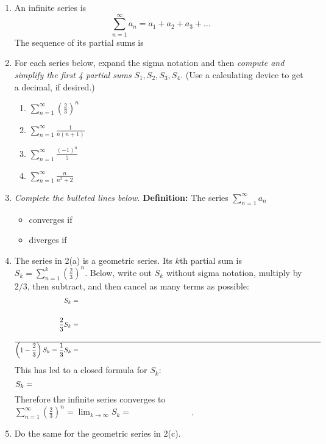 \documentclass[11pt,fleqn]{article}
\newcommand{\ds}{\displaystyle}
\begin{document}
\normalsize
\vspace{-5mm}
\hrulefill
\begin{enumerate}
\item An infinite series is
    $$\sum_{n=1}^\infty a_n = a_1 + a_2 + a_3 + \dots$$
The sequence of its partial sums is

\vspace{1.5in}

\item For each series below, expand the sigma notation and then \emph{compute and simplify the first 4 partial sums} $S_1, S_2, S_3,S_4.$  (Use a calculating device to get a decimal, if desired.) 
	\begin{enumerate}
	\item $\displaystyle \sum_{n=1}^\infty \left( \frac{2}{3} \right)^n$
	\vfill
	\item $\displaystyle \sum_{n=1}^\infty  \frac{1}{n(n+1)} $
	\vfill
	\item $\displaystyle \sum_{n=1}^\infty  \frac{(-1)^n}{5}$
	\vfill

\clearpage\newpage
	\item $\displaystyle \sum_{n=1}^\infty  \frac{n}{n^2+2}$
	\vfill
	\end{enumerate}

\item \emph{Complete the bulleted lines below.} \quad \textbf{Definition:} The series $\ds \sum_{n=1}^\infty a_n$ \\
\begin{itemize}
	\item converges if \\
	
	\item diverges if \\
	
\end{itemize}

\item The series in 2(a) is a geometric series.  Its $k$th partial sum is $\ds S_k = \sum_{n=1}^k \left(\frac{2}{3}\right)^n$.  Below, write out $S_k$ without sigma notation, multiply by $2/3$, then subtract, and then cancel as many terms as possible:
\begin{align*}
S_k &= \hspace{5.0in} \\ \\
\frac{2}{3} S_k &= \\ \\ \hline
\left(1 - \frac{2}{3}\right) S_k = \frac{1}{3} S_k &=
\end{align*}
This has led to a closed formula for $S_k$:
	$$S_k = \hspace{5.0in}$$
Therefore the infinite series converges to \quad $\ds \sum_{n=1}^\infty \left(\frac{2}{3}\right)^n = \lim_{k\to\infty} S_k = \boxed{\phantom{\int fosd asdf sdfa}}$.

\item Do the same for the geometric series in 2(c).

\vspace{1.7in}
\end{enumerate}
\end{document}
